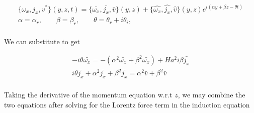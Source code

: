 \documentclass[11pt]{article}
\begin{document}
\begin{equation}\begin{aligned}
\{\omega_x,j_x,v^*\}(y,z,t) = \{\bar{\omega_x},\bar{j_x},\bar{v}\}(y,z) + \{\hat{\omega_x},\hat{j_x},\hat{v}\} (y,z) e^{i(\alpha y + \beta z - \theta t)} \\
\alpha = \alpha_r, \qquad \beta = \beta_r, \qquad \theta = \theta_r + i \theta_i,  \\
\end{aligned}\end{equation}

We can substitute to get

\begin{equation}\begin{aligned}
-i\theta \bar{\omega_x} = - (\alpha^2 \bar{\omega_x} + \beta^2 \bar{\omega_x}) + Ha^2 i \beta \bar{j_x} \\
i\theta \bar{j_x} + \alpha^2 \bar{j_x} + \beta^2 \bar{j_x} = \alpha^2 \bar{v} + \beta^2 \bar{v} \\
\end{aligned}\end{equation}

Taking the derivative of the momentum equation w.r.t $z$, we may combine the two equations
after solving for the Lorentz force term in the induction equation
\end{document}
